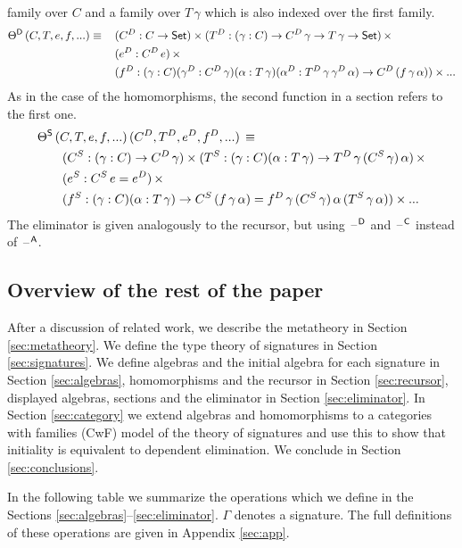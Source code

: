\documentclass[acmsmall,review,anonymous]{acmart}\settopmatter{printfolios=true,printccs=false,printacmref=false}
\begin{document}
family over $C$ and a family over $T\,\gamma$ which is also indexed
over the first family.
\begin{alignat*}{5}
  & \Theta^{\mathsf{D}}\,(C,T,e,f,...)\equiv\, && (C^D:C\rightarrow \mathsf{Set})\times(T^D:(\gamma:C)\rightarrow C^D\,\gamma\rightarrow T\,\gamma\rightarrow \mathsf{Set})\,\times \\
  & && (e^D:C^D\,e)\,\times \\
  & && (f^D:(\gamma:C)(\gamma^D:C^D\,\gamma)(\alpha:T\,\gamma)(\alpha^D:T^D\,\gamma\,\gamma^D\,\alpha)\rightarrow C^D\,(f\,\gamma\,\alpha))\times...
\end{alignat*}
As in the case of the homomorphisms, the second function in a section
refers to the first one.
\begin{alignat*}{5}
  & \Theta^{\mathsf{S}}\,(C,T,e,f,...)\,(C^D,T^D,e^D,f^D,...)\,\equiv \\
  & \hspace{2em} (C^S:(\gamma:C)\rightarrow C^D\,\gamma)\times(T^S:(\gamma:C)(\alpha:T\,\gamma)\rightarrow T^D\,\gamma\,(C^S\,\gamma)\,\alpha)\,\times \\
  & \hspace{2em} (e^S:C^S\,e=e^D)\,\times \\
  & \hspace{2em} (f^S:(\gamma:C)(\alpha:T\,\gamma)\rightarrow C^S\,(f\,\gamma\,\alpha)=f^D\,\gamma\,(C^S\,\gamma)\,\alpha\,(T^S\,\gamma\,\alpha))\times ...
\end{alignat*}
The eliminator is given analogously to the recursor, but using
$\mathord{\hspace{1pt}\text{--}\hspace{1pt}}^{\mathsf{D}}$ and $\mathord{\hspace{1pt}\text{--}\hspace{1pt}}^{\mathsf{C}}$ instead of $\mathord{\hspace{1pt}\text{--}\hspace{1pt}}^{\mathsf{A}}$.

\subsection{Overview of the rest of the paper}

After a discussion of related work, we describe the metatheory in
Section \ref{sec:metatheory}. We define the type theory of signatures
in Section \ref{sec:signatures}. We define algebras and the initial
algebra for each signature in Section \ref{sec:algebras},
homomorphisms and the recursor in Section \ref{sec:recursor},
displayed algebras, sections and the eliminator in Section
\ref{sec:eliminator}. In Section \ref{sec:category} we extend algebras
and homomorphisms to a categories with families (CwF) model of the
theory of signatures and use this to show that initiality
is equivalent to dependent elimination. We conclude in
Section \ref{sec:conclusions}.

In the following table we summarize the operations which we define in
the Sections \ref{sec:algebras}--\ref{sec:eliminator}. $\Gamma$
denotes a signature. The full definitions of these operations are
given in Appendix \ref{sec:app}.
\end{document}
